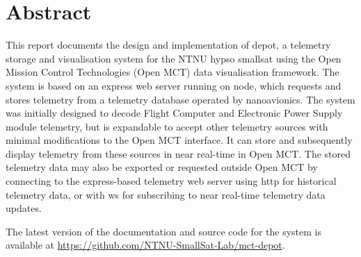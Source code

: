 \begin{comment}

\end{comment}

\section{Abstract}
This report documents the design and implementation of \Gls{depot}, a \gls{telemetry} storage and visualisation system for the NTNU \acrshort{hypso} \Gls{smallsat} using the Open Mission Control Technologies (Open MCT) data visualisation framework. The system is based on an \Gls{express} web server running on \Gls{node}, which requests and stores telemetry from a telemetry database operated by \Gls{nanoavionics}. The system was initially designed to decode Flight Computer and Electronic Power Supply module telemetry, but is expandable to accept other telemetry sources with minimal modifications to the Open MCT interface. It can store and subsequently display telemetry from these sources in near real-time in Open MCT. The stored telemetry data may also be exported or requested outside Open MCT by connecting to the \Gls{express}-based telemetry web server using \acrshort{http} for historical telemetry data, or with \Gls{ws} for subscribing to near real-time telemetry data updates.

The latest version of the documentation and source code for the system is available at \url{https://github.com/NTNU-SmallSat-Lab/mct-depot}.

\clearpage